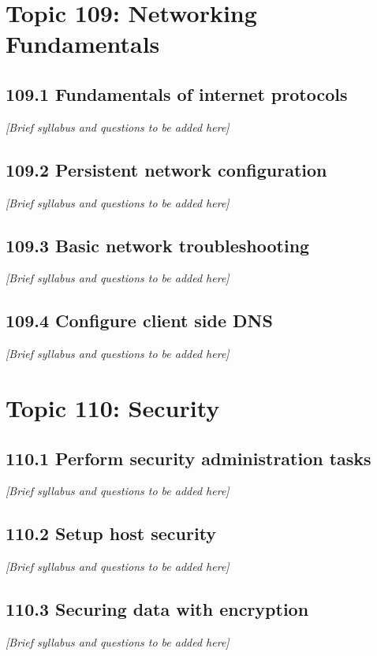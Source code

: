 \documentclass[a4paper]{report}
\begin{document}
\chapter{Topic 109: Networking Fundamentals}
\section{109.1 Fundamentals of internet protocols}
\textit{[Brief syllabus and questions to be added here]}

\section{109.2 Persistent network configuration}
\textit{[Brief syllabus and questions to be added here]}

\section{109.3 Basic network troubleshooting}
\textit{[Brief syllabus and questions to be added here]}

\section{109.4 Configure client side DNS}
\textit{[Brief syllabus and questions to be added here]}

\chapter{Topic 110: Security}
\section{110.1 Perform security administration tasks}
\textit{[Brief syllabus and questions to be added here]}

\section{110.2 Setup host security}
\textit{[Brief syllabus and questions to be added here]}

\section{110.3 Securing data with encryption}
\textit{[Brief syllabus and questions to be added here]}
\end{document}
